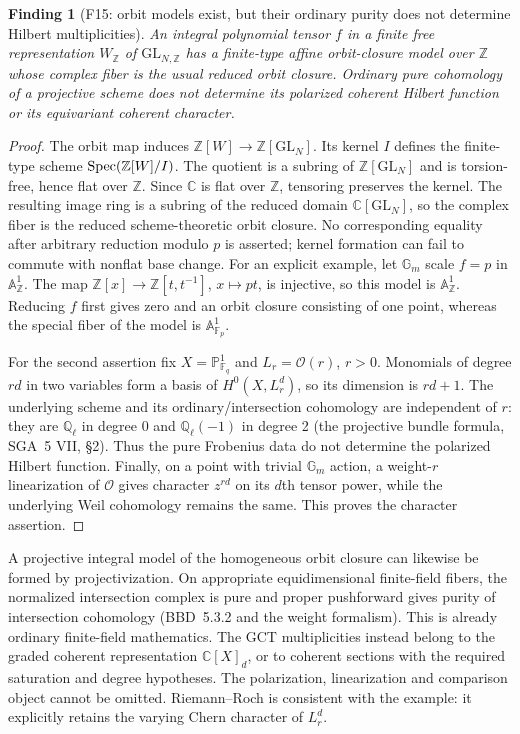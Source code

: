 \documentclass[11pt,a4paper]{article}
\newcommand{\Q}{\mathbb Q}\newcommand{\Z}{\mathbb Z}\newcommand{\C}{\mathbb C}\newcommand{\N}{\mathbb N}\newcommand{\F}{\mathbb F}
\newcommand{\A}{\mathbb A}\newcommand{\PP}{\mathbb P}\newcommand{\GL}{\mathrm{GL}}
\newcommand{\fid}[1]{\textsf{#1}}\newcommand{\gate}[1]{\textsf{#1}}
\theoremstyle{named}\newtheorem{finding}{Finding}[section]
\theoremstyle{definition}\newtheorem{definition}[finding]{Definition}
\theoremstyle{remark}\newtheorem{remark}[finding]{Remark}
\begin{document}
\begin{finding}[\fid{F15}: orbit models exist, but their ordinary purity does not determine Hilbert multiplicities]\label{f:orbit}
An integral polynomial tensor $f$ in a finite free representation $W_\Z$ of $\GL_{N,\Z}$ has a finite-type affine orbit-closure model over $\Z$ whose complex fiber is the usual reduced orbit closure. Ordinary pure cohomology of a projective scheme does not determine its polarized coherent Hilbert function or its equivariant coherent character.
\end{finding}
\begin{proof}
The orbit map induces $\Z[W]\to\Z[\GL_N]$. Its kernel $I$ defines the finite-type scheme $\Spec(\Z[W]/I)$. The quotient is a subring of $\Z[\GL_N]$ and is torsion-free, hence flat over $\Z$. Since $\C$ is flat over $\Z$, tensoring preserves the kernel. The resulting image ring is a subring of the reduced domain $\C[\GL_N]$, so the complex fiber is the reduced scheme-theoretic orbit closure. No corresponding equality after arbitrary reduction modulo $p$ is asserted; kernel formation can fail to commute with nonflat base change. For an explicit example, let $\mathbb G_m$ scale $f=p$ in $\A^1_\Z$. The map $\Z[x]\to\Z[t,t^{-1}]$, $x\mapsto pt$, is injective, so this model is $\A^1_\Z$. Reducing $f$ first gives zero and an orbit closure consisting of one point, whereas the special fiber of the model is $\A^1_{\F_p}$.

For the second assertion fix $X=\PP^1_{\F_q}$ and $L_r=\mathcal O(r)$, $r>0$. Monomials of degree $rd$ in two variables form a basis of $H^0(X,L_r^d)$, so its dimension is $rd+1$. The underlying scheme and its ordinary/intersection cohomology are independent of $r$: they are $\Q_\ell$ in degree 0 and $\Q_\ell(-1)$ in degree 2 (the projective bundle formula, SGA~5 VII, \S2). Thus the pure Frobenius data do not determine the polarized Hilbert function. Finally, on a point with trivial $\mathbb G_m$ action, a weight-$r$ linearization of $\mathcal O$ gives character $z^{rd}$ on its $d$th tensor power, while the underlying Weil cohomology remains the same. This proves the character assertion.
\end{proof}
A projective integral model of the homogeneous orbit closure can likewise be formed by projectivization. On appropriate equidimensional finite-field fibers, the normalized intersection complex is pure and proper pushforward gives purity of intersection cohomology (BBD~5.3.2 and the weight formalism). This is already ordinary finite-field mathematics. The GCT multiplicities instead belong to the graded coherent representation $\C[X]_d$, or to coherent sections with the required saturation and degree hypotheses. The polarization, linearization and comparison object cannot be omitted. Riemann--Roch is consistent with the example: it explicitly retains the varying Chern character of $L_r^d$.
\end{document}
